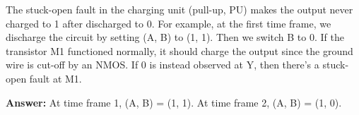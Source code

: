 The stuck-open fault in the charging unit (pull-up, PU) makes the output never charged to 1 after discharged to 0. For example, at the first time frame, we discharge the circuit by setting (A, B) to (1, 1). Then we switch B to 0. If the transistor M1 functioned normally, it should charge the output since the ground wire is cut-off by an NMOS. If 0 is instead observed at Y, then there's a stuck-open fault at M1.

\textbf{Answer:} At time frame 1, (A, B) = (1, 1). At time frame 2, (A, B) = (1, 0).
